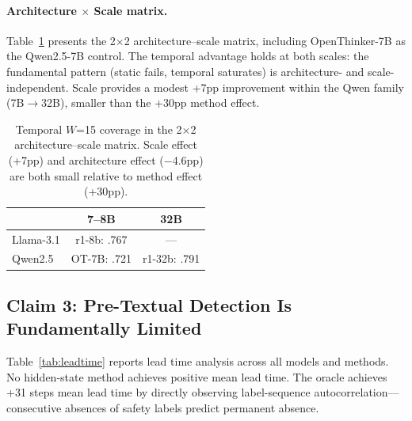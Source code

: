 \documentclass[11pt,a4paper]{article}
\begin{document}
\paragraph{Architecture $\times$ Scale matrix.}
Table~\ref{tab:arch_scale} presents the 2$\times$2 architecture--scale matrix, including OpenThinker-7B as the Qwen2.5-7B control.
The temporal advantage holds at both scales: the fundamental pattern (static fails, temporal saturates) is architecture- and scale-independent.
Scale provides a modest +7pp improvement within the Qwen family (7B$\to$32B), smaller than the +30pp method effect.

\begin{table}[t]
\centering
\small
\begin{tabular}{lcc}
\toprule
& \textbf{7--8B} & \textbf{32B} \\
\midrule
Llama-3.1 & r1-8b: .767 & --- \\
Qwen2.5 & OT-7B: .721 & r1-32b: .791 \\
\bottomrule
\end{tabular}
\caption{Temporal $W$=15 coverage in the 2$\times$2 architecture--scale matrix.  Scale effect (+7pp) and architecture effect ($-$4.6pp) are both small relative to method effect (+30pp).}
\label{tab:arch_scale}
\end{table}

\subsection{Claim 3: Pre-Textual Detection Is Fundamentally Limited}

Table~\ref{tab:leadtime} reports lead time analysis across all models and methods.
No hidden-state method achieves positive mean lead time.
The oracle achieves +31 steps mean lead time by directly observing label-sequence autocorrelation---consecutive absences of safety labels predict permanent absence.
\end{document}
